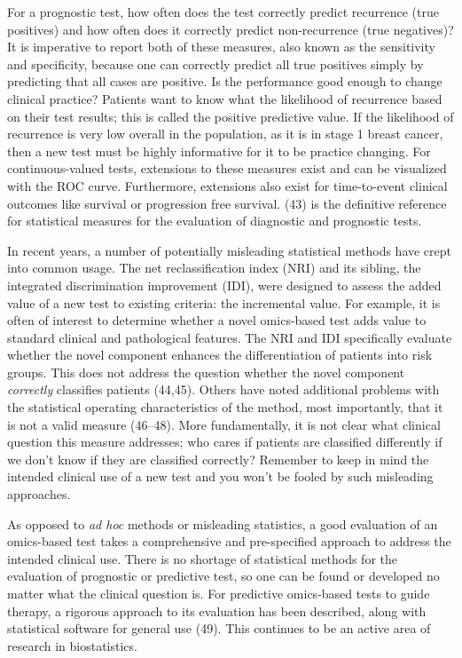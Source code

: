 \documentclass[11pt]{article}
\begin{document}
For a prognostic test, how often does the test correctly predict
recurrence (true positives) and how often does it correctly predict
non-recurrence (true negatives)? It is imperative to report both of
these measures, also known as the sensitivity and specificity, because
one can correctly predict all true positives simply by predicting that
all cases are positive. Is the performance good enough to change
clinical practice? Patients want to know what the likelihood of
recurrence based on their test results; this is called the positive
predictive value. If the likelihood of recurrence is very low overall in
the population, as it is in stage 1 breast cancer, then a new test must
be highly informative for it to be practice changing. For
continuous-valued tests, extensions to these measures exist and can be
visualized with the ROC curve. Furthermore, extensions also exist for
time-to-event clinical outcomes like survival or progression free
survival. (43) is the definitive reference for statistical measures for
the evaluation of diagnostic and prognostic tests.

In recent years, a number of potentially misleading statistical methods
have crept into common usage. The net reclassification index (NRI) and
its sibling, the integrated discrimination improvement (IDI), were
designed to assess the added value of a new test to existing criteria:
the incremental value. For example, it is often of interest to determine
whether a novel omics-based test adds value to standard clinical and
pathological features. The NRI and IDI specifically evaluate whether the
novel component enhances the differentiation of patients into risk
groups. This does not address the question whether the novel component
\emph{correctly} classifies patients (44,45). Others have noted
additional problems with the statistical operating characteristics of
the method, most importantly, that it is not a valid measure (46--48).
More fundamentally, it is not clear what clinical question this measure
addresses; who cares if patients are classified differently if we don't
know if they are classified correctly? Remember to keep in mind the
intended clinical use of a new test and you won't be fooled by such
misleading approaches.

As opposed to \emph{ad hoc} methods or misleading statistics, a good
evaluation of an omics-based test takes a comprehensive and
pre-specified approach to address the intended clinical use. There is no
shortage of statistical methods for the evaluation of prognostic or
predictive test, so one can be found or developed no matter what the
clinical question is. For predictive omics-based tests to guide therapy,
a rigorous approach to its evaluation has been described, along with
statistical software for general use (49). This continues to be an
active area of research in biostatistics.
\end{document}
